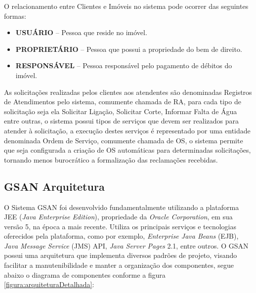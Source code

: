 O relacionamento entre Clientes e Imóveis no sistema pode ocorrer das seguintes formas:

\begin{itemize}
	\item \textbf{USUÁRIO} – Pessoa que reside no imóvel.
	\item \textbf{PROPRIETÁRIO} – Pessoa que possui a propriedade do bem de direito.
	\item \textbf{RESPONSÁVEL} – Pessoa responsável pelo pagamento de débitos do imóvel.	
\end{itemize}

As solicitações realizadas pelos clientes aos atendentes são denominadas Registros de Atendimentos pelo sistema, comumente chamada de RA, para cada tipo de solicitação seja ela Solicitar Ligação, Solicitar Corte, Informar Falta de Água entre outras, o sistema possui tipos de serviços que devem ser realizados para atender à solicitação, a execução destes serviços é representado por uma  entidade denominada Ordem de Serviço, comumente chamada de OS, o sistema permite que seja configurada a criação de OS automáticas para determinadas solicitações, tornando menos burocrático a formalização das reclamações recebidas.



\subsection{GSAN Arquitetura}
	
O Sistema GSAN foi desenvolvido fundamentalmente utilizando a plataforma JEE (\textit{Java Enterprise Edition}), propriedade da \textit{Oracle Corporation}, em sua versão 5, na época a mais recente. Utiliza os principais serviços e tecnologias oferecidos pela plataforma, como por exemplo, \textit{Enterprise Java Beans} (EJB), \textit{Java Message Service} (JMS) API, \textit{Java Server Pages} 2.1, entre outros.
O GSAN possui uma arquitetura que implementa diversos padrões de projeto, visando facilitar a manutenibilidade e manter a organização dos componentes, segue abaixo o diagrama de componentes conforme a figura \ref{figura:arquiteturaDetalhada}:

